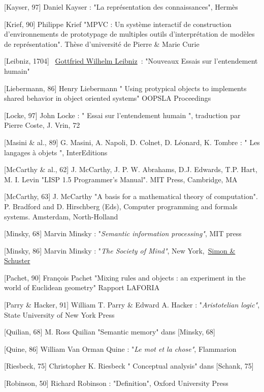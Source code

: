 \documentclass[a4paper, 12pt, openright, french]{book}
\begin{document}
{[}Kayser, 97{]} Daniel Kayser : "La représentation des connaissances",
Hermès

{[}Krief, 90{]} Philippe Krief "MPVC : Un système interactif de
construction d'environnements de prototypage de
multiples outils d'interprétation de modèles de
représentation". Thèse d'université de Pierre \& Marie
Curie

{[}Leibniz, 1704{]}
~\href{https://fr.wikipedia.org/wiki/Gottfried_Wilhelm_Leibniz}{Gottfried
Wilhelm Leibniz}~: "Nouveaux Essais sur l'entendement
humain"

{[}Liebermann, 86{]} Henry Liebermann " Using protypical objects to
implements shared behavior in object oriented systems" OOPSLA
Proceedings

{[}Locke, 97{]} John Locke : " Essai sur l'entendement humain ",
traduction par Pierre Coste, J. Vrin, 72

{[}Masini \& al., 89{]} G. Masini, A. Napoli, D. Colnet, D. Léonard, K.
Tombre : " Les langages à objets ", InterEditions

{[}McCarthy \& al., 62{]} J. McCarthy, J. P. W. Abrahams, D.J. Edwards,
T.P. Hart, M. I. Levin "LISP 1.5 Programmer's Manual".
MIT Press, Cambridge, MA

{[}McCarthy, 63{]} J. McCarthy "A basis for a mathematical theory of
computation". P. Bradford and D. Hirschberg (Eds), Computer programming
and formals systems. Amsterdam, North-Holland

{[}Minsky, 68{]} Marvin Minsky : "\emph{Semantic information
processing"}, MIT press

{[}Minsky, 86{]} Marvin Minsky : "\emph{The Society of Mind"}, New
York,~\href{https://fr.wikipedia.org/wiki/Simon_\%26_Schuster}{Simon \&
Schuster}

{[}Pachet, 90{]} François Pachet "Mixing rules and objects : an
experiment in the world of Euclidean geometry" Rapport LAFORIA

{[}Parry \& Hacker, 91{]} William T. Parry \& Edward A. Hacker :
"\emph{Aristotelian logic"}, State University of New York Press

{[}Quilian, 68{]} M. Ross Quilian "Semantic memory" dans {[}Minsky,
68{]}

{[}Quine, 86{]} William Van Orman Quine : "\emph{Le mot et la chose"},
Flammarion

{[}Riesbeck, 75{]} Christopher K. Riesbeck " Conceptual analysis" dans
{[}Schank, 75{]}

{[}Robinson, 50{]} Richard Robinson : "Definition", Oxford University
Press
\end{document}
